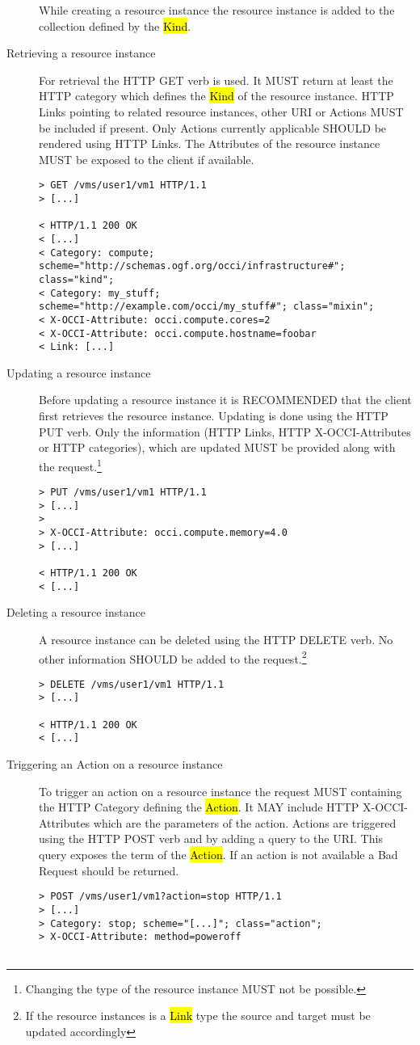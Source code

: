 \documentclass[10pt,a4paper]{article}
\begin{document}
\begin{description}
  While creating a resource instance the resource instance is added to
  the collection defined by the \hl{Kind}.

\item[Retrieving a resource instance] For retrieval the HTTP GET verb
  is used. It MUST return at least the HTTP category which defines the
  \hl{Kind} of the resource instance. HTTP Links pointing to related
  resource instances, other URI or Actions MUST be included if
  present. Only Actions currently applicable SHOULD be rendered using
  HTTP Links. The Attributes of the resource instance MUST be exposed
  to the client if available.
\begin{verbatim}
> GET /vms/user1/vm1 HTTP/1.1
> [...]
 
< HTTP/1.1 200 OK
< [...]
< Category: compute; scheme="http://schemas.ogf.org/occi/infrastructure#"; class="kind";
< Category: my_stuff; scheme="http://example.com/occi/my_stuff#"; class="mixin";
< X-OCCI-Attribute: occi.compute.cores=2
< X-OCCI-Attribute: occi.compute.hostname=foobar
< Link: [...]
\end{verbatim}

\item[Updating a resource instance] Before updating a resource
  instance it is RECOMMENDED that the client first retrieves the
  resource instance. Updating is done using the HTTP PUT verb. Only
  the information (HTTP Links, HTTP X-OCCI-Attributes or HTTP
  categories), which are updated MUST be provided along with the
  request.\footnote{Changing the type of the resource instance MUST
    not be possible.}
\begin{verbatim}
> PUT /vms/user1/vm1 HTTP/1.1
> [...]
> 
> X-OCCI-Attribute: occi.compute.memory=4.0
> [...]
 
< HTTP/1.1 200 OK
< [...]
\end{verbatim}

\item[Deleting a resource instance] A resource instance can be deleted
  using the HTTP DELETE verb. No other information SHOULD be added to
  the request.\footnote{If the resource instances is a \hl{Link} type
    the source and target must be updated accordingly}
\begin{verbatim}
> DELETE /vms/user1/vm1 HTTP/1.1
> [...]

< HTTP/1.1 200 OK
< [...]
\end{verbatim}

\item[Triggering an Action on a resource instance] To trigger an
  action on a resource instance the request MUST containing the HTTP
  Category defining the \hl{Action}. It MAY include HTTP
  X-OCCI-Attributes which are the parameters of the action. Actions
  are triggered using the HTTP POST verb and by adding a query to the
  URI. This query exposes the term of the \hl{Action}. If an action is
  not available a Bad Request should be returned.
\begin{verbatim}
> POST /vms/user1/vm1?action=stop HTTP/1.1
> [...]
> Category: stop; scheme="[...]"; class="action";
> X-OCCI-Attribute: method=poweroff


\end{verbatim}
\end{description}
\end{document}
